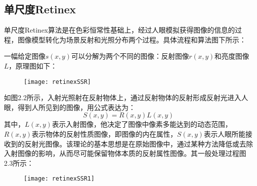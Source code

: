 				\subsection{单尺度Retinex}单尺度Retinex算法是在色彩恒常性基础上，经过人眼模拟获得图像的信息的过程，图像模型转化为场景反射和光照分布两个过程。具体流程和算法图下所示：

一幅给定图像$s(x,y)$可以分解为两个不同的图像：反射图像$r(x,y)$和亮度图像$L$，原理图如下：

\begin{figure}[!htbp]
    \centering
    \texttt{[image: retinexSSR]}
    \label{fig:tc_q_criteria}
\end{figure}


如图2.2所示，入射光照射在反射物体上，通过反射物体的反射形成反射光进入人眼，得到人所见到的图像，用公式表达为：
\begin{equation}     S(x,y)=R(x,y)L(x,y)    \end{equation}	
其中，$L(x,y)$表示入射图像，他决定了图像中像素多能达到的动态范围，$R(x,y)$表示物体的反射性质图像，即图像的内在属性，$S(x,y)$表示人眼所能接收到的反射光图像。该理论的基本思想是在原始图像中，通过某种方法降低或去除入射图像的影响，从而尽可能保留物体本质的反射属性图像。其一般处理过程图2.3所示：


\begin{figure}[!htbp]
    \centering
    \texttt{[image: retinexSSR1]}
    \label{fig:tc_q_criteria}
\end{figure}

